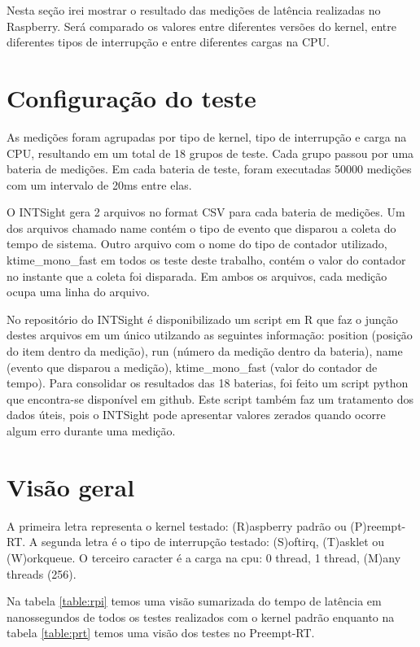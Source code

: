 
Nesta seção irei mostrar o resultado das medições de latência realizadas no Raspberry. Será comparado os valores entre diferentes versões do kernel, entre diferentes tipos de interrupção e entre diferentes cargas na CPU.

\section{Configuração do teste}

As medições foram agrupadas por tipo de kernel, tipo de interrupção e carga na CPU, resultando em um total de 18 grupos de teste. Cada grupo passou por uma bateria de medições. Em cada bateria de teste, foram executadas 50000 medições com um intervalo de 20ms entre elas. 

O INTSight gera 2 arquivos no format CSV para cada bateria de medições. Um dos arquivos chamado name contém o tipo de evento que disparou a coleta do tempo de sistema. Outro arquivo com o nome do tipo de contador utilizado, ktime\_mono\_fast em todos os teste deste trabalho, contém o valor do contador no instante que a coleta foi disparada. Em ambos os arquivos, cada medição ocupa uma linha do arquivo.

No repositório do INTSight é disponibilizado um script em R que faz o junção destes arquivos em um único utilzando as seguintes informação: position (posição do item dentro da medição), run (número da medição dentro da bateria), name (evento que disparou a medição), ktime\_mono\_fast (valor do contador de tempo). Para consolidar os resultados das 18 baterias, foi feito um script python que encontra-se disponível em github. Este script também faz um tratamento dos dados úteis, pois o INTSight pode apresentar valores zerados quando ocorre algum erro durante uma medição.

\section{Visão geral}

A primeira letra representa o kernel testado: (R)aspberry padrão ou (P)reempt-RT.
A segunda letra é o tipo de interrupção testado: (S)oftirq, (T)asklet ou (W)orkqueue.
O terceiro caracter é a carga na cpu: 0 thread, 1 thread, (M)any threads (256).

Na tabela \ref{table:rpi} temos uma visão sumarizada do tempo de latência em nanossegundos de todos os testes realizados com o kernel padrão enquanto na tabela \ref{table:prt} temos uma visão dos testes no Preempt-RT.

